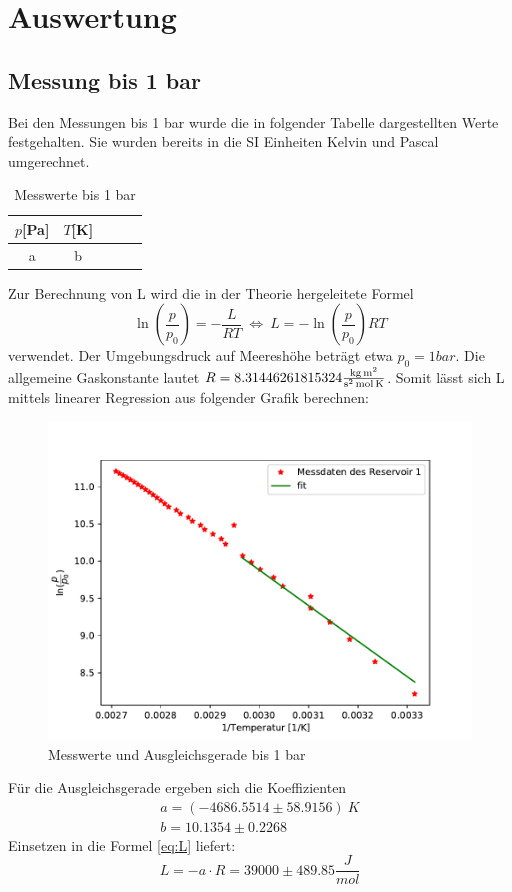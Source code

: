 \section{Auswertung}
\label{sec:Auswertung}
\subsection{Messung bis 1 bar}

  Bei den Messungen bis 1 bar wurde die in folgender Tabelle dargestellten Werte festgehalten. Sie
  wurden bereits in die SI Einheiten Kelvin und Pascal umgerechnet.
  \begin{table}[H]
    \centering
   \caption{Messwerte bis 1 bar}
   \label{tab:data}
   \begin{tabular}{c c c c c}
   \toprule
    $p$[Pa] & $T$[K] \\
    \midrule
      a & b \\
    \bottomrule
    \end{tabular}
  \end{table}

  Zur Berechnung von L wird die in der Theorie hergeleitete Formel 
  \begin{equation}
    \label{eq:L}
    \ln{(\dfrac{p}{p_0})}=-\dfrac{L}{RT}\ \Leftrightarrow \ L=-\ln{(\dfrac{p}{p_0})}RT
  \end{equation} 
  verwendet. Der Umgebungsdruck auf Meereshöhe beträgt etwa
  $p_0=1 bar$. Die allgemeine Gaskonstante lautet $R=8.31446261815324
  {\displaystyle \textstyle {\frac {\mathrm {kg\,m^{2}} }{\mathrm {s^{2}\,mol\,K} }}} $. Somit lässt 
  sich L mittels linearer Regression aus folgender Grafik berechnen: 
  \begin{figure}[H]
   \centering
   \includegraphics{plot1.pdf}
   \caption{Messwerte und Ausgleichsgerade bis 1 bar}
   \label{fig:plot}
  \end{figure}
  Für die Ausgleichsgerade ergeben sich die Koeffizienten
  \begin{align*}
   a=(-4686.5514 \pm 58.9156)\ K\\
   b=10.1354 \pm 0.2268
  \end{align*}
  Einsetzen in die Formel \eqref{eq:L} liefert:
  \begin{equation*}
    L= - a \cdot R = 39000 \pm 489.85 \dfrac{J}{mol}
  \end{equation*}


